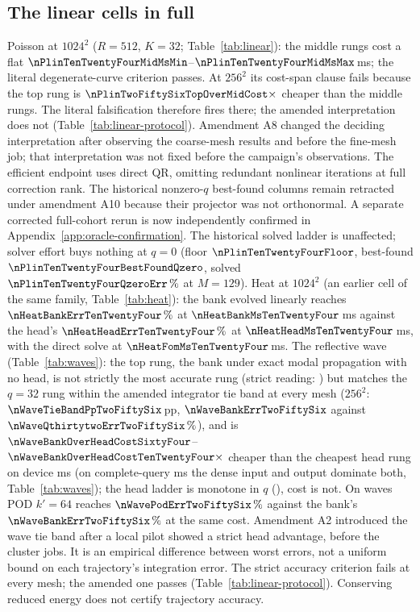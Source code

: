 \subsection{The linear cells in full}
\label{app:extended:linear}
Poisson at $1024^2$ ($R=512$, $K=32$; Table~\ref{tab:linear}): the middle
rungs cost a flat
$\nPlinTenTwentyFourMidMsMin$--$\nPlinTenTwentyFourMidMsMax$\,ms; the
literal degenerate-curve criterion passes. At $256^2$ its cost-span
clause fails because the top rung is
$\nPlinTwoFiftySixTopOverMidCost\times$ cheaper than the middle rungs.
The literal falsification therefore fires there; the amended
interpretation does not (Table~\ref{tab:linear-protocol}). Amendment A8
changed the deciding interpretation after observing the coarse-mesh
results and before the fine-mesh job; that interpretation was not fixed
before the campaign's observations. The efficient endpoint uses direct
QR, omitting redundant nonlinear iterations at full correction rank.
The historical nonzero-$q$ best-found columns remain retracted under
amendment A10 because their projector was not orthonormal. A separate
corrected full-cohort rerun is now independently confirmed in
Appendix~\ref{app:oracle-confirmation}. The historical solved ladder is unaffected;
solver effort buys nothing at $q=0$ (floor $\nPlinTenTwentyFourFloor$,
best-found $\nPlinTenTwentyFourBestFoundQzero$, solved
$\nPlinTenTwentyFourQzeroErr\,\%$ at $M=129$). Heat at $1024^2$ (an
earlier cell of the same family, Table~\ref{tab:heat}): the bank evolved
linearly reaches $\nHeatBankErrTenTwentyFour\,\%$ at
$\nHeatBankMsTenTwentyFour$\,ms against the head's
$\nHeatHeadErrTenTwentyFour\,\%$ at $\nHeatHeadMsTenTwentyFour$\,ms, with
the direct solve at $\nHeatFomMsTenTwentyFour$\,ms. The reflective wave
(Table~\ref{tab:waves}): the top rung, the bank under exact modal
propagation with no head, is not strictly the most accurate rung (strict
reading: \nWaveTopStrictBestTwoFiftySix{}) but matches the $q=32$ rung
within the amended integrator tie band at every mesh ($256^2$:
$\nWaveTieBandPpTwoFiftySix$\,pp,
$\nWaveBankErrTwoFiftySix$ against $\nWaveQthirtytwoErrTwoFiftySix\,\%$),
and is
$\nWaveBankOverHeadCostSixtyFour$--$\nWaveBankOverHeadCostTenTwentyFour\times$
cheaper than the cheapest head rung on device ms (on complete-query ms
the dense input and output dominate both, Table~\ref{tab:waves}); the head ladder is monotone in $q$
(\nWaveHeadLadderMonotoneTwoFiftySix{}), cost is not. On waves POD $k'=64$
reaches $\nWavePodErrTwoFiftySix\,\%$ against the bank's
$\nWaveBankErrTwoFiftySix\,\%$ at the same cost. Amendment A2 introduced
the wave tie band after a local pilot showed a strict head advantage,
before the cluster jobs. It is an empirical difference between worst
errors, not a uniform bound on each trajectory's integration error.
The strict accuracy criterion fails at every mesh; the amended one
passes (Table~\ref{tab:linear-protocol}). Conserving reduced energy does
not certify trajectory accuracy.

